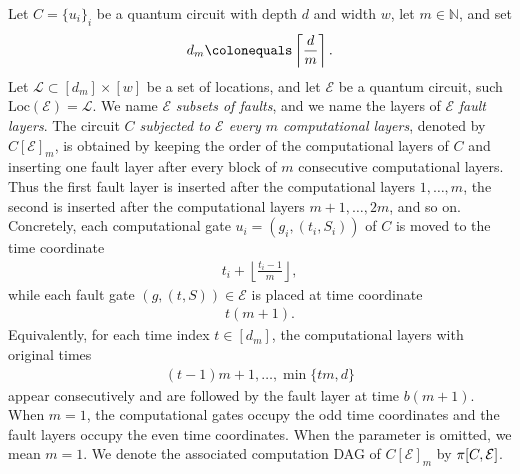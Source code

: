 \begin{definition}
  Let $C=\{u_i\}_i$ be a quantum circuit with depth $d$ and width $w$, let $m\in\mathbb{N}$, and set
  \begin{equation*}
    \begin{split}
      d_m \colonequals \left\lceil \frac{d}{m} \right\rceil.
    \end{split}
  \end{equation*}
  Let $\mathcal{L}\subset [d_m]\times [w]$ be a set of locations, and let $\mathcal{E}$ be a quantum circuit, such $\text{Loc}(\mathcal{E}) = \mathcal{L}$. We name $\mathcal{E}$ \textit{subsets of faults}, and we name the layers of $\mathcal{E}$ \textit{fault layers}.
  The circuit \textit{$C$ subjected to $\mathcal{E}$ every $m$ computational layers}, denoted by $C[\mathcal{E}]_{m}$, is obtained by keeping the order of the computational layers of $C$ and inserting one fault layer after every block of $m$ consecutive computational layers. Thus the first fault layer is inserted after the computational layers $1,\ldots,m$, the second is inserted after the computational layers $m+1,\ldots,2m$, and so on. Concretely, each computational gate $u_i=(g_i,(t_i,S_i))$ of $C$ is moved to the time coordinate
  \begin{equation*}
    \begin{split}
      t_i + \left\lfloor \frac{t_i-1}{m} \right\rfloor,
    \end{split}
  \end{equation*}
  while each fault gate $(g,(t,S))\in\mathcal{E}$ is placed at time coordinate
  \begin{equation*}
    \begin{split}
      t(m+1).
    \end{split}
  \end{equation*}
  Equivalently, for each time index $t\in[d_m]$, the computational layers with original times
  \begin{equation*}
    \begin{split}
      (t-1)m+1,\ldots,\min\{tm,d\}
    \end{split}
  \end{equation*}
  appear consecutively and are followed by the fault layer at time $b(m+1)$.
  When $m=1$, the computational gates occupy the odd time coordinates and the fault layers occupy the even time coordinates. When the parameter is omitted, we mean $m=1$. We denote the associated computation DAG of $C[\mathcal{E}]_{m}$ by $\pi[C,\mathcal{E}]$.
\end{definition}

